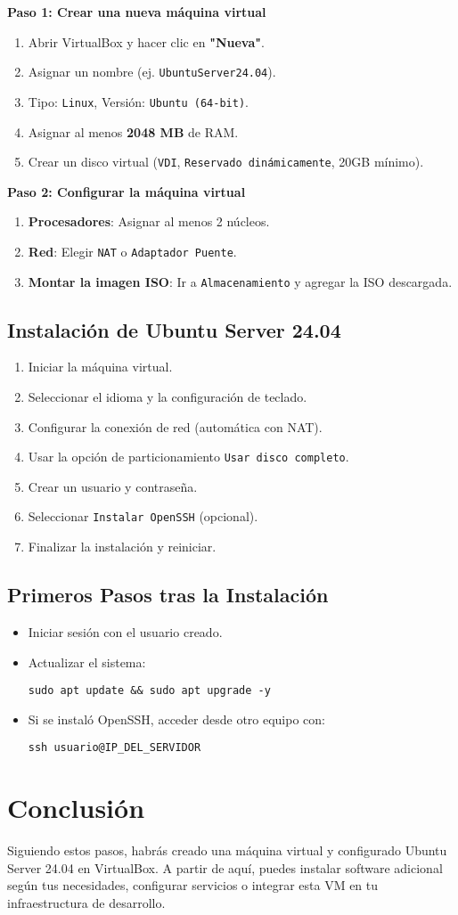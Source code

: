 \documentclass{article}
\begin{document}
\textbf{Paso 1: Crear una nueva máquina virtual}
\begin{enumerate}
    \item Abrir VirtualBox y hacer clic en \textbf{"Nueva"}.
    \item Asignar un nombre (ej. \texttt{UbuntuServer24.04}).
    \item Tipo: \texttt{Linux}, Versión: \texttt{Ubuntu (64-bit)}.
    \item Asignar al menos \textbf{2048 MB} de RAM.
    \item Crear un disco virtual (\texttt{VDI}, \texttt{Reservado dinámicamente}, 20GB mínimo).
\end{enumerate}

\textbf{Paso 2: Configurar la máquina virtual}
\begin{enumerate}
    \item \textbf{Procesadores}: Asignar al menos 2 núcleos.
    \item \textbf{Red}: Elegir \texttt{NAT} o \texttt{Adaptador Puente}.
    \item \textbf{Montar la imagen ISO}: Ir a \texttt{Almacenamiento} y agregar la ISO descargada.
\end{enumerate}

\subsection{Instalación de Ubuntu Server 24.04}
\begin{enumerate}
    \item Iniciar la máquina virtual.
    \item Seleccionar el idioma y la configuración de teclado.
    \item Configurar la conexión de red (automática con NAT).
    \item Usar la opción de particionamiento \texttt{Usar disco completo}.
    \item Crear un usuario y contraseña.
    \item Seleccionar \texttt{Instalar OpenSSH} (opcional).
    \item Finalizar la instalación y reiniciar.
\end{enumerate}

\subsection{Primeros Pasos tras la Instalación}
\begin{itemize}
    \item Iniciar sesión con el usuario creado.
    \item Actualizar el sistema:
    \begin{verbatim}
sudo apt update && sudo apt upgrade -y
    \end{verbatim}
    \item Si se instaló OpenSSH, acceder desde otro equipo con:
    \begin{verbatim}
ssh usuario@IP_DEL_SERVIDOR
    \end{verbatim}
\end{itemize}

\section{Conclusión}
Siguiendo estos pasos, habrás creado una máquina virtual y configurado Ubuntu Server 24.04 en VirtualBox. A partir de aquí, puedes instalar software adicional según tus necesidades, configurar servicios o integrar esta VM en tu infraestructura de desarrollo.
\end{document}
